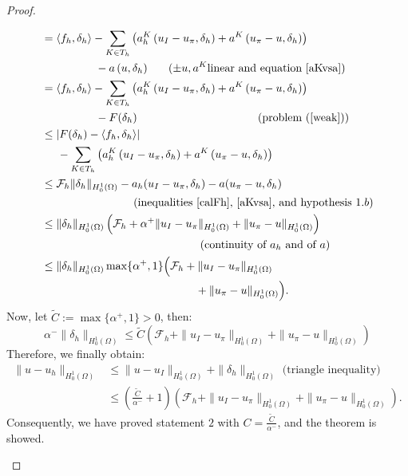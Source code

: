 \begin{proof}
\begin{enumerate}
\begin{align*}
&= \langle f_h, \delta_h\rangle - \sum_{K\in T_h}\left( a_h^K\left( u_I-u_\pi,\delta_h \right) + a^K\left( u_\pi-u, \delta_h \right) \right) \\
&\hspace{1.7cm}- a\left( u, \delta_h \right) \hspace{0.6cm} (\pm u, a^K \text{linear and equation \ref{aKvsa})}\\
&= \langle f_h, \delta_h\rangle - \sum_{K\in T_h}\left( a_h^K\left( u_I-u_\pi,\delta_h \right) + a^K\left( u_\pi-u, \delta_h \right) \right) \\
&\hspace{1.7cm}- F(\delta_h) \hspace{3.8cm}\text{(problem (\ref{weak}))}\\
&\leq |F(\delta_h) - \langle f_h, \delta_h \rangle| \\
&\hspace{0.5cm} - \sum_{K\in T_h}\left( a_h^K\left( u_I-u_\pi,\delta_h \right) + a^K\left( u_\pi-u, \delta_h \right) \right)\\
&\leq \mathcal{F}_h\|\delta_h\|_{H_0^1(\Omega)}-a_h(u_I-u_\pi,\delta_h)-a(u_\pi-u,\delta_h)\\
&\hspace{2.9cm} \text{(inequalities \ref{calFh}, \ref{aKvsa}, and hypothesis }1.b)\\
&\leq \|\delta_h\|_{H_0^1(\Omega)} \left (\mathcal{F}_h + \alpha^+\|u_I-u_\pi\|_{H_0^1(\Omega)} + \|u_\pi-u\|_{H_0^1(\Omega)} \right)\\
&\hspace{5cm} (\text{continuity of } a_h \text{ and of } a)\\
&\leq \|\delta_h\|_{H_0^1(\Omega)} \max\{\alpha^+,1\} \Big(\mathcal{F}_h + \|u_I-u_\pi\|_{H_0^1(\Omega)} \\
& \hspace{4.85cm} + \|u_\pi-u\|_{H_0^1(\Omega)} \Big).
\end{align*}
Now, let $\tilde{C} := \max\{\alpha^+,1\}>0$, then:
\begin{equation*}
\alpha^- \|\delta_h\|_{H_0^1(\Omega)}\leq \tilde{C}\left(\mathcal{F}_h + \|u_I-u_\pi\|_{H_0^1(\Omega)} + \|u_\pi-u\|_{H_0^1(\Omega)} \right)
\end{equation*}
Therefore, we finally obtain:
\begin{align*}
\|u-u_h\|_{H_0^1(\Omega)} &\leq \|u-u_I\|_{H_0^1(\Omega)} + \|\delta_h\|_{H_0^1(\Omega)} \text{ (triangle inequality)}\\ 
&\leq \left(\frac{\tilde{C}}{\alpha^-}+1\right)\left(\mathcal{F}_h + \|u_I-u_\pi\|_{H_0^1(\Omega)} + \|u_\pi-u\|_{H_0^1(\Omega)} \right).
\end{align*}
Consequently, we have proved statement $2$ with $C=\frac{\tilde{C}}{\alpha^-}$, and the theorem is showed. 
\end{enumerate}
\end{proof}

